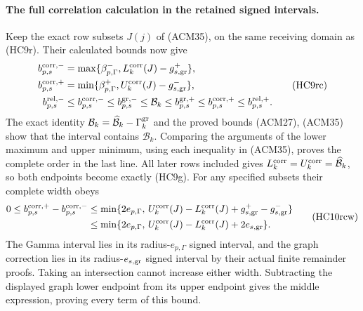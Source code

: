 \paragraph{The full correlation calculation in the retained signed intervals.}
Keep the exact row subsets $J(j)$ of (ACM35), on the same
receiving domain as (HC9r). Their calculated bounds now give
\[
\begin{aligned}
 b_{p,s}^{\rm corr,-}
 &=\max\{\beta_{p,\Gamma}^-,L_k^{\rm corr}(J)-g_{s,\rm gr}^+\},\\
 b_{p,s}^{\rm corr,+}
 &=\min\{\beta_{p,\Gamma}^+,U_k^{\rm corr}(J)-g_{s,\rm gr}^-\},\\
 b_{p,s}^{\rm rel,-}&\leq b_{p,s}^{\rm corr,-}
 \leq b_{p,s}^{\rm gr,-}\leq\mathcal B_k
 \leq b_{p,s}^{\rm gr,+}\leq b_{p,s}^{\rm corr,+}
 \leq b_{p,s}^{\rm rel,+}.
\end{aligned}\tag{HC9rc}
\]
The exact identity $\mathcal B_k=\widehat{\mathcal B}_k-\Gamma_k^{\rm gr}$
and the proved bounds (ACM27), (ACM35) show that the interval
contains $\mathcal B_k$. Comparing the arguments of the lower
maximum and upper minimum, using each inequality in (ACM35),
proves the complete order in the last line. All later rows
included gives $L_k^{\rm corr}=U_k^{\rm corr}=\widehat{\mathcal B}_k$,
so both endpoints become exactly (HC9g). For any specified
subsets their complete width obeys
\[
\begin{aligned}
 0\leq b_{p,s}^{\rm corr,+}-b_{p,s}^{\rm corr,-}
 &\leq\min\{2e_{p,\Gamma},\,
 U_k^{\rm corr}(J)-L_k^{\rm corr}(J)
                     +g_{s,\rm gr}^+-g_{s,\rm gr}^-\}\\
 &\leq\min\{2e_{p,\Gamma},\,
 U_k^{\rm corr}(J)-L_k^{\rm corr}(J)+2e_{s,\rm gr}\}.
\end{aligned}\tag{HC10rcw}
\]
The Gamma interval lies in its radius-$e_{p,\Gamma}$ signed
interval, and the graph correction lies in its radius-$e_{s,\rm gr}$
signed interval by their actual finite remainder proofs. Taking
an intersection cannot increase either width. Subtracting the
displayed graph lower endpoint from its upper endpoint gives
the middle expression, proving every term of this bound.

